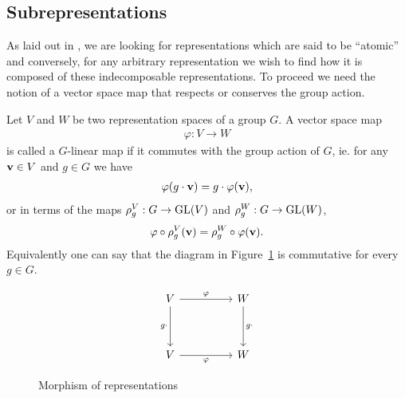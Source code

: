 \subsection{Subrepresentations}\label{sect:subrepr}

As laid out in \cite{FultonHarris}, we are looking for representations which are said to be ``atomic'' and conversely, for any arbitrary representation we wish to find how it is composed of these indecomposable representations. To proceed we need the notion of a vector space map that respects or conserves the group action.	


\begin{definition}\cite{FultonHarris}
	Let $V$ and $W$ be two representation spaces of a group $G$. A vector space map 
	\begin{align*}
		\varphi: V \rightarrow W
	\end{align*} 
	is called a $G$-linear map if it commutes with the group action of $G$, ie. for any $\mathbf{v} \in V$ and $g \in G$ we have
	\begin{align*}
		\varphi( g \cdot \mathbf{v} ) = g \cdot \varphi (\mathbf{v}),
	\end{align*}
	or in terms of the maps $\rho_g^V: G \rightarrow \text{GL}(V)$ and $\rho_g^W: G \rightarrow \text{GL}(W)$,
	\begin{align*}
		\varphi \circ \rho^V_g (\mathbf{v}) = \rho^W_g \circ \varphi (\mathbf{v}).
	\end{align*}
	Equivalently one can say that the diagram in Figure~\ref*{fig:commapmorp} is commutative for every $g \in G$.
	\begin{figure}[hbt!]
		\centering
		\[\begin{tikzcd}
			V && W \\
			\\
			V && W
			\arrow["\varphi", from=1-1, to=1-3]
			\arrow["g\cdot"', from=1-1, to=3-1]
			\arrow["g\cdot", from=1-3, to=3-3]
			\arrow["\varphi"', from=3-1, to=3-3]
		\end{tikzcd}\]
		\caption{Morphism of representations}
		\label{fig:commapmorp}
	\end{figure}
\end{definition}

